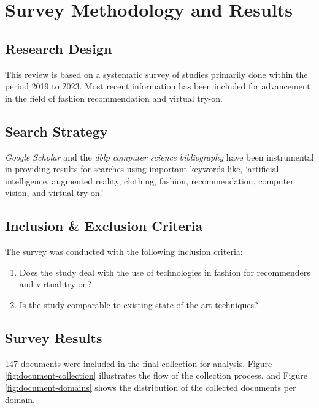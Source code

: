 \section{Survey Methodology and Results} \label{section:survey-methodology}
	\subsection{Research Design}
		This review is based on a systematic survey of studies primarily done within the period 2019 to 2023. Most recent information has been included for advancement in the field of fashion recommendation and virtual try-on.
	
	\subsection{Search Strategy}
		\textit{Google Scholar} and the \textit{dblp computer science bibliography} have been instrumental in providing results for searches using important keywords like, `artificial intelligence, augmented reality, clothing, fashion, recommendation, computer vision, and virtual try-on.'

	\subsection{Inclusion \& Exclusion Criteria}
		The survey was conducted with the following inclusion criteria:
		\begin{enumerate}
			\item Does the study deal with the use of technologies in fashion for recommenders and virtual try-on?
			\item Is the study comparable to existing state-of-the-art techniques?
		\end{enumerate}
	
	\subsection{Survey Results}
		147 documents were included in the final collection for analysis. Figure \ref{fig:document-collection} illustrates the flow of the collection process, and Figure \ref{fig:document-domains} shows the distribution of the collected documents per domain.

